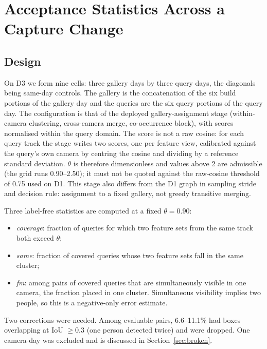 \documentclass[journal]{IEEEtran}
\begin{document}
\section{Acceptance Statistics Across a Capture Change}\label{sec:xday}
\subsection{Design}
On D3 we form nine cells: three gallery days by three query days, the diagonals being same-day controls. The gallery is the concatenation of the six build portions of the gallery day and the queries are the six query portions of the query day. The configuration is that of the deployed gallery-assignment stage (within-camera clustering, cross-camera merge, co-occurrence block), with scores normalised within the query domain. The score is not a raw cosine: for each query track the stage writes two scores, one per feature view, calibrated against the query's own camera by centring the cosine and dividing by a reference standard deviation. $\theta$ is therefore dimensionless and values above 2 are admissible (the grid runs 0.90--2.50); it must not be quoted against the raw-cosine threshold of 0.75 used on D1. This stage also differs from the D1 graph in sampling stride and decision rule: assignment to a fixed gallery, not greedy transitive merging.

Three label-free statistics are computed at a fixed $\theta = 0.90$:
\begin{itemize}
\item \emph{coverage}: fraction of queries for which two feature sets from the same track both exceed $\theta$;
\item \emph{same}: fraction of covered queries whose two feature sets fall in the same cluster;
\item \emph{fm}: among pairs of covered queries that are simultaneously visible in one camera, the fraction placed in one cluster. Simultaneous visibility implies two people, so this is a negative-only error estimate.
\end{itemize}

Two corrections were needed. Among evaluable pairs, 6.6--11.1\% had boxes overlapping at IoU $\ge 0.3$ (one person detected twice) and were dropped. One camera-day was excluded and is discussed in Section~\ref{sec:broken}.
\end{document}
